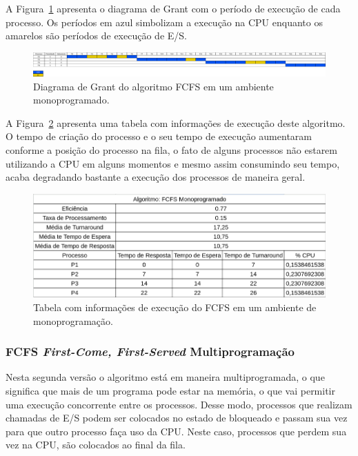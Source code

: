 \documentclass[
	12pt,				%
	oneside,   	        %
	a4paper,			%
	english,			%
	french,				%
	spanish,			%
	brazil,				%
	]{pacotes/abntex2}
\begin{document}
A Figura~\ref{fig:fcfs_mono} apresenta o diagrama de Grant com o período de execução de cada processo. Os períodos em azul simbolizam a execução na CPU enquanto os amarelos são períodos de execução de E/S.

\begin{figure}[H]
  \centering
  \includegraphics[scale=0.20]{figuras/ex1/fcfs_mono.png}
  \caption{Diagrama de Grant do algoritmo FCFS em um ambiente monoprogramado.}
  \label{fig:fcfs_mono}
\end{figure}

A Figura~\ref{fig:table_fcfs_mono} apresenta uma tabela com informações de execução deste algoritmo. O tempo de criação do processo e o seu tempo de execução aumentaram conforme a posição do processo na fila, o fato de alguns processos não estarem utilizando a CPU em  alguns momentos e mesmo assim consumindo seu tempo, acaba degradando bastante a execução dos processos de maneira geral.

\begin{figure}[H]
  \centering
  \includegraphics[scale=0.5]{figuras/ex1/table_fcfs_mono.png}
  \caption{Tabela com informações de execução do FCFS em um ambiente de monoprogramação.}
  \label{fig:table_fcfs_mono}
\end{figure}

\subsubsection{FCFS \textit{First-Come, First-Served} Multiprogramação}
\label{subsubsec:multi_fcfs}

Nesta segunda versão o algoritmo está em maneira multiprogramada, o que significa que mais de um programa pode estar na memória, o que vai permitir uma execução concorrente entre os processos. Desse modo, processos que realizam chamadas de E/S podem ser colocados no estado de bloqueado e passam sua vez para que outro processo faça uso da CPU. Neste caso, processos que perdem sua vez na CPU, são colocados ao final da fila. 
\end{document}
